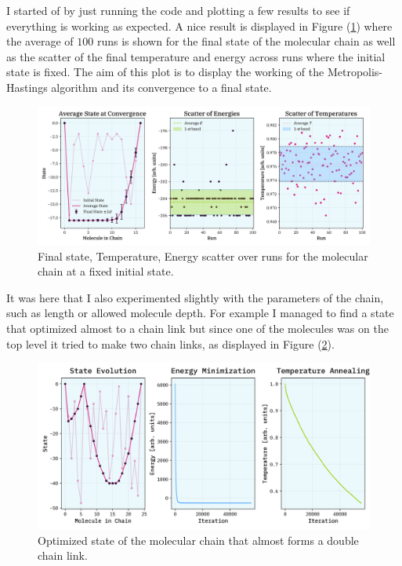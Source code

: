 \documentclass[10pt, titlepage, a4paper]{article}
\begin{document}
I started of by just running the code and plotting a few results to see if everything is working 
as expected. A nice result is displayed in Figure (\ref{fig:molecular-demo}) where the average of $100$ runs is shown 
for the final state of the molecular chain as well as the scatter of the final temperature and energy across runs where 
the initial state is fixed. The aim of this plot is to display the working of the Metropolis-Hastings algorithm and its 
convergence to a final state. 

\begin{figure}[h!]
    \centering
    \includegraphics[width=.95\textwidth]{../fixed-init-multiple.png}
    \caption{Final state, Temperature, Energy scatter over runs for the molecular chain at a fixed initial state.}
    \label{fig:molecular-demo}
\end{figure}

It was here that I also experimented slightly with the parameters of the chain, such as length or allowed molecule depth.
For example I managed to find a state that optimized almost to a chain link but since one of the molecules was on the top level it tried to make 
two chain links, as displayed in Figure (\ref{fig:chain-link}). 

\begin{figure}[h!]
    \centering
    \includegraphics[width=.95\textwidth]{../accidental-veriznica.png}
    \caption{Optimized state of the molecular chain that almost forms a double chain link.}
    \label{fig:chain-link}
\end{figure}
\end{document}

